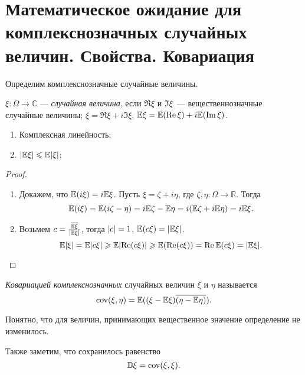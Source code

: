 \section{Математическое ожидание для комплекснозначных случайных величин. Свойства. Ковариация}

Определим комплекснозначные случайные величины.

 \begin{definition}
     $\xi\colon \Omega\rightarrow\mathbb{C}$ --- \textit{случайная величина}, если $\Re\xi$ и $\Im\xi$~--- вещественнозначные случайные величины;
     $\xi = \Re\xi + i\Im\xi$, $\mathbb{E} \xi = \mathbb{E} (\operatorname{Re}\xi) + i\mathbb{E} (\operatorname{Im}\xi)$.
 \end{definition}

 \begin{properties}
\enewline
     \begin{enumerate}
         \item Комплексная линейность;
                

         \item $\lvert\mathbb{E} \xi\rvert \leqslant \mathbb{E} \lvert\xi\rvert$;

               
     \end{enumerate}
 \end{properties}

\begin{proof}
 \enewline
     \begin{enumerate}
         \item Докажем, что $\mathbb{E} (i\xi) = i\mathbb{E} \xi$. Пусть $\xi = \zeta + i\eta$, где $\zeta, \eta\colon \Omega\rightarrow\mathbb{R}$. Тогда
               $$\mathbb{E} (i\xi) = \mathbb{E} (i\zeta - \eta) = i\mathbb{E} \zeta - \mathbb{E} \eta = i(\mathbb{E} \zeta + i\mathbb{E} \eta) = i\mathbb{E} \xi.$$
               \item Возьмем $c=\frac{\overline{\mathbb{E} \xi}}{\lvert\mathbb{E} \xi\rvert}$, тогда $\lvert c\rvert = 1$, $\mathbb{E} (c\xi) = \lvert\mathbb{E} \xi\rvert$.
               $$\mathbb{E} \lvert\xi\rvert = \mathbb{E} \lvert c\xi\rvert \geqslant \mathbb{E} \lvert\operatorname{Re}(c\xi)\rvert \geqslant \mathbb{E} (\operatorname{Re}(c\xi)) = \operatorname{Re} \mathbb{E} (c\xi) = \lvert\mathbb{E} \xi\rvert.$$
               \qedhere
     \end{enumerate}
\end{proof}
 \begin{definition} \textit{Ковариацией комплекснозначных} случайных величин $\xi$ и $\eta$ называется
     $$\text{cov} (\xi, \eta) = \mathbb{E} ((\xi -\mathbb{E} \xi)\overline{(\eta - \mathbb{E} \eta)}).$$
 \end{definition}
 
 Понятно, что для величин, принимающих вещественное значение определение не изменилось.
 
 Также заметим, что сохранилось равенство
 $$\mathbb{D}\xi = \text{cov} (\xi, \xi).$$\newpage

